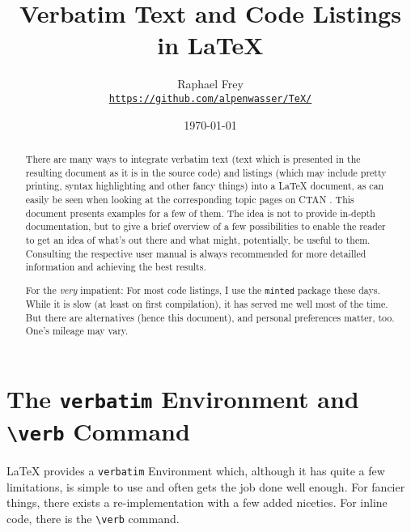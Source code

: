 \documentclass[article,a4paper,oneside,10pt]{memoir}
\title{\textsf{\Huge Verbatim Text and Code Listings in \LaTeX}}
\author{Raphael Frey\\[2mm]\small%
    \href{https://github.com/alpenwasser/TeX/tree/master/listings}
         {\nolinkurl{https://github.com/alpenwasser/TeX/}}}
\date{\vspace{1em}\today}
\newcommand\code[1]{\texttt{#1}}
\begin{document}


\maketitle

\begin{abstract}
    There  are   many  ways  to   integrate  verbatim  text  (text   which  is
    presented  in  the  resulting  document  as it  is  in  the  source  code)
    and  listings  (which may  include  pretty  printing, syntax  highlighting
    and  other  fancy  things)  into   a  \LaTeX{}  document,  as  can  easily
    be  seen   when  looking  at   the  corresponding  topic  pages   on  CTAN
    \cite{ctan:topic:listings,ctan:topic:verbatim}. This   document   presents
    examples  for  a  few  of  them. The  idea  is  not  to  provide  in-depth
    documentation, but  to give  a brief  overview of  a few  possibilities to
    enable the  reader to  get an  idea of  what's out  there and  what might,
    potentially, be useful to them.   Consulting the respective user manual is
    always recommended for  more detailled information and  achieving the best
    results.

    For  the  \emph{very}  impatient: For  most   code  listings,  I  use  the
    \code{minted}  package these  days. While it  is slow  (at least  on first
    compilation),  it has  served  me well  most of  the  time. But there  are
    alternatives  (hence  this  document), and  personal  preferences  matter,
    too. One's mileage may vary.
\end{abstract}

\tableofcontents*


\newpage
\chapter{The \code{verbatim} Environment and \code{\textbackslash{}verb} Command}
\label{chap:verbatim}

\LaTeX{} provides a \code{verbatim} Environment which, although it has quite a
few  limitations,  is  simple  to  use  and  often  gets  the  job  done  well
enough. For fancier things, there exists  a re-implementation with a few added
niceties. For inline code, there is the \code{\textbackslash{}verb} command.
\end{document}
